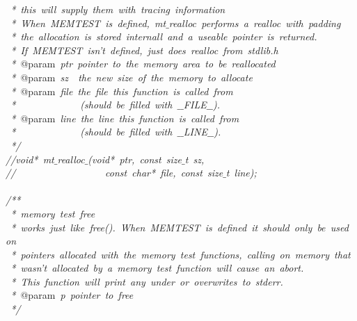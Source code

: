 \documentclass{article}
\begin{document}
\mbox{}\textit{\ *\ this\ will\ supply\ them\ with\ tracing\ information} \\
\mbox{}\textit{\ *\ When\ MEMTEST\ is\ defined,\ mt$\_$realloc\ performs\ a\ realloc\ with\ padding} \\
\mbox{}\textit{\ *\ the\ allocation\ is\ stored\ internall\ and\ a\ useable\ pointer\ is\ returned.} \\
\mbox{}\textit{\ *\ If\ MEMTEST\ isn't\ defined,\ just\ does\ realloc\ from\ stdlib.h} \\
\mbox{}\textit{\ *\ }@param\textit{\ ptr\ pointer\ to\ the\ memory\ area\ to\ be\ reallocated} \\
\mbox{}\textit{\ *\ }@param\textit{\ sz\ \ the\ new\ size\ of\ the\ memory\ to\ allocate} \\
\mbox{}\textit{\ *\ }@param\textit{\ file\ the\ file\ this\ function\ is\ called\ from} \\
\mbox{}\textit{\ *\ \ \ \ \ \ \ \ \ \ \ \ \ (should\ be\ filled\ with\ $\_$$\_$FILE$\_$$\_$).} \\
\mbox{}\textit{\ *\ }@param\textit{\ line\ the\ line\ this\ function\ is\ called\ from} \\
\mbox{}\textit{\ *\ \ \ \ \ \ \ \ \ \ \ \ \ (should\ be\ filled\ with\ $\_$$\_$LINE$\_$$\_$).} \\
\mbox{}\textit{\ */} \\
\mbox{}\textit{//void*\ mt$\_$realloc$\_$(void*\ ptr,\ const\ size$\_$t\ sz,} \\
\mbox{}\textit{//\ \ \ \ \ \ \ \ \ \ \ \ \ \ \ \ \ \ const\ char*\ file,\ const\ size$\_$t\ line);} \\
\mbox{} \\
\mbox{}\textit{/**} \\
\mbox{}\textit{\ *\ memory\ test\ free} \\
\mbox{}\textit{\ *\ works\ just\ like\ free().\ When\ MEMTEST\ is\ defined\ it\ should\ only\ be\ used\ on} \\
\mbox{}\textit{\ *\ pointers\ allocated\ with\ the\ memory\ test\ functions,\ calling\ on\ memory\ that} \\
\mbox{}\textit{\ *\ wasn't\ allocated\ by\ a\ memory\ test\ function\ will\ cause\ an\ abort.} \\
\mbox{}\textit{\ *\ This\ function\ will\ print\ any\ under\ or\ overwrites\ to\ stderr.} \\
\mbox{}\textit{\ *\ }@param\textit{\ p\ pointer\ to\ free} \\
\mbox{}\textit{\ */} \\
\end{document}
